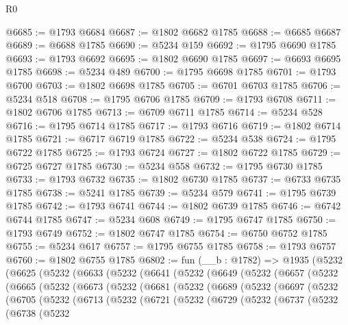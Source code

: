 \begin{lexlean}{R0}
\begin{coremodule}
@6685 := @1793 @6684
@6687 := @1802 @6682 @1785
@6688 := @6685 @6687
@6689 := @6688 @1785
@6690 := @5234 @159
@6692 := @1795 @6690 @1785
@6693 := @1793 @6692
@6695 := @1802 @6690 @1785
@6697 := @6693 @6695 @1785
@6698 := @5234 @489
@6700 := @1795 @6698 @1785
@6701 := @1793 @6700
@6703 := @1802 @6698 @1785
@6705 := @6701 @6703 @1785
@6706 := @5234 @518
@6708 := @1795 @6706 @1785
@6709 := @1793 @6708
@6711 := @1802 @6706 @1785
@6713 := @6709 @6711 @1785
@6714 := @5234 @528
@6716 := @1795 @6714 @1785
@6717 := @1793 @6716
@6719 := @1802 @6714 @1785
@6721 := @6717 @6719 @1785
@6722 := @5234 @538
@6724 := @1795 @6722 @1785
@6725 := @1793 @6724
@6727 := @1802 @6722 @1785
@6729 := @6725 @6727 @1785
@6730 := @5234 @558
@6732 := @1795 @6730 @1785
@6733 := @1793 @6732
@6735 := @1802 @6730 @1785
@6737 := @6733 @6735 @1785
@6738 := @5241 @1785
@6739 := @5234 @579
@6741 := @1795 @6739 @1785
@6742 := @1793 @6741
@6744 := @1802 @6739 @1785
@6746 := @6742 @6744 @1785
@6747 := @5234 @608
@6749 := @1795 @6747 @1785
@6750 := @1793 @6749
@6752 := @1802 @6747 @1785
@6754 := @6750 @6752 @1785
@6755 := @5234 @617
@6757 := @1795 @6755 @1785
@6758 := @1793 @6757
@6760 := @1802 @6755 @1785
@6802 := fun (__b : @1782) =>
  @1935
    (@5232
      (@6625
        (@5232
          (@6633
            (@5232
              (@6641
                (@5232
                  (@6649
                    (@5232
                      (@6657
                        (@5232
                          (@6665
                            (@5232
                              (@6673
                                (@5232
                                  (@6681
                                    (@5232
                                      (@6689
                                        (@5232
                                          (@6697
                                            (@5232
                                              (@6705
                                                (@5232
                                                  (@6713
                                                    (@5232
                                                      (@6721
                                                        (@5232
                                                          (@6729
                                                            (@5232
                                                              (@6737
                                                                (@5232
                                                                  (@6738
                                                                    (@5232

\end{coremodule}
\end{lexlean}

